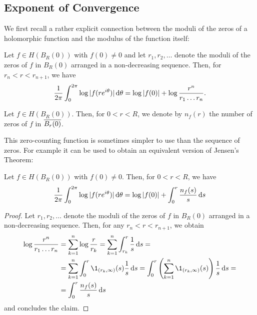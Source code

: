 \subsection{Exponent of Convergence}

We first recall a rather explicit connection between the moduli of the zeros of a holomorphic function and the modulus of the function itself:

\begin{theorem} \label{thm:jensen}
    Let $f \in H(B_R(0))$ with $f(0) \neq 0$ and let $r_1, r_2, \hdots$ denote the moduli of the zeros of $f$ in $B_{R}(0)$ arranged in a non-decreasing sequence. Then, for $r_n < r < r_{n+1}$, we have
    \begin{equation}
        \frac{1}{2 \pi} \int_0^{2\pi} \log \vert f(r e^{i \theta}) \vert \mathop{}\!\mathrm{d} \theta = \log \vert f(0) \vert + \log \frac{r^n}{r_1 \hdots r_n}.
    \end{equation}
\end{theorem}

\begin{definition}
    Let $f \in H(B_R(0))$. Then, for $0 < r < R$, we denote by $n_f(r)$ the number of zeros of $f$ in $\overline{B_{r}(0)}$.
\end{definition}

This zero-counting function is sometimes simpler to use than the sequence of zeros. For example it can be used to obtain an equivalent version of Jensen's Theorem:

\begin{corollary} \label{cor:jensen-nf}
    Let $f \in H(B_R(0))$ with $f(0) \neq 0$. Then, for $0 < r < R$, we have
    \begin{equation}
        \frac{1}{2 \pi} \int_0^{2\pi} \log \vert f(re^{i \theta}) \vert \mathop{}\!\mathrm{d} \theta = \log \vert f(0) \vert + \int_0^r \frac{n_f(s)}{s} \mathop{}\!\mathrm{d} s
    \end{equation}
\end{corollary}

\begin{proof}
    Let $r_1, r_2, \hdots$ denote the moduli of the zeros of $f$ in $B_{R}(0)$ arranged in a non-decreasing sequence. Then, for any $r_n < r < r_{n+1}$, we obtain
    \begin{align*}
        \log \frac{r^n}{r_1 \hdots r_n} &= \sum_{k=1}^n \log \frac{r}{r_k} = \sum_{k=1}^n \int_{r_k}^r \frac{1}{s} \diff s = \\
        &= \sum_{k=1}^n \int_0^r \1_{(r_k, \infty)}(s) \frac{1}{s} \diff s = \int_0^r \left( \sum_{k=1}^n \1_{(r_k, \infty)}(s) \right) \frac{1}{s} \diff s = \\
        &= \int_0^r \frac{n_f(s)}{s} \diff s
    \end{align*}
    and  concludes the claim.
\end{proof}

